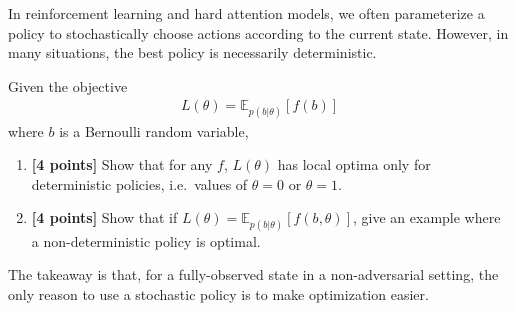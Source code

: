 \documentclass{harvardml}
\newcommand{\E}{\mathbb{E}}
\theoremstyle{plain}
\begin{document}





\begin{problem}

In reinforcement learning and hard attention models, we often parameterize a policy to stochastically choose actions according to the current state.
However, in many situations, the best policy is necessarily deterministic.

Given the objective
%
\begin{align}
L(\theta) = \E_{p(b|\theta)} \left[ f(b) \right]
\end{align}
%
where $b$ is a Bernoulli random variable,

\begin{enumerate}[label=(\alph*)]
\item {\bf [4 points]} Show that for any $f$, $L(\theta)$ has local optima only for deterministic policies, i.e.\ values of $\theta = 0$ or $\theta = 1$.

\item {\bf [4 points]} Show that if $L(\theta) = \E_{p(b|\theta)} \left[ f(b, \theta) \right]$, give an example where a non-deterministic policy is optimal.
\end{enumerate}

The takeaway is that, for a fully-observed state in a non-adversarial setting, the only reason to use a stochastic policy is to make optimization easier.
\end{problem}




\end{document}
